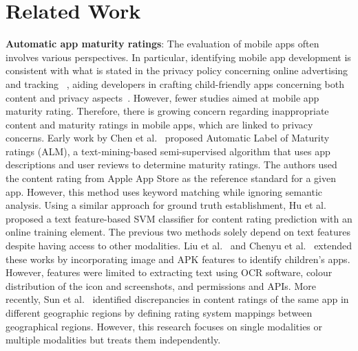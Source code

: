 \section{Related Work}
\label{Sec:related_work}

\textbf{Automatic app maturity ratings}: The evaluation of mobile apps often involves various perspectives. In particular, identifying mobile app development is consistent with what is stated in the privacy policy concerning online advertising and tracking ~\cite{nguyen2022freely, nguyen2021measuring}, aiding developers in crafting child-friendly apps concerning both content and privacy aspects~\cite{hu2015protectingcikm, liccardi2014can}. However, fewer studies aimed at mobile app maturity rating. Therefore, there is growing concern regarding inappropriate content and maturity ratings in mobile apps, which are linked to privacy concerns. Early work by Chen et al.~\cite{chen2013isthisapp} proposed Automatic Label of Maturity ratings (ALM), a text-mining-based semi-supervised algorithm that uses app descriptions and user reviews to determine maturity ratings. The authors used the content rating from Apple App Store as the reference standard for a given app. However, this method uses keyword matching while ignoring semantic analysis. Using a similar approach for ground truth establishment, Hu et al.~\cite{hu2015protectingcikm} proposed a text feature-based SVM classifier for content rating prediction with an online training element. The previous two methods solely depend on text features despite having access to other modalities. Liu et al.~\cite{liu2016identifying} and Chenyu et al.~\cite{zhou2022automatic} extended these works by incorporating image and APK features to identify children’s apps. However, features were limited to extracting text using OCR software, colour distribution of the icon and screenshots, and permissions and APIs. More recently, Sun et al.~\cite{sun2023not} identified discrepancies in content ratings of the same app in different geographic regions by defining rating system mappings between geographical regions. However, this research focuses on single modalities or multiple modalities but treats them independently. \\ 

